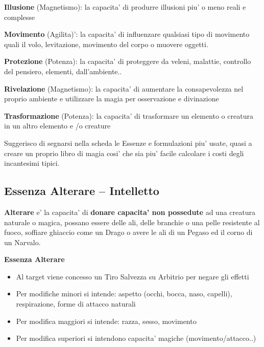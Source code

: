 \documentclass[a4paper,11pt,twoside,openany]{book}
\begin{document}
\textbf{Illusione} (Magnetismo): la capacita' di produrre illusioni piu' o meno reali e complesse

\textbf{Movimento} (Agilita)': la capacita' di influenzare qualsiasi tipo di movimento quali il volo, levitazione, movimento del corpo o muovere oggetti.

\textbf{Protezione} (Potenza): la capacita' di proteggere da veleni, malattie, controllo del pensiero, elementi, dall'ambiente..

\textbf{Rivelazione} (Magnetismo): la capacita' di aumentare la consapevolezza nel proprio ambiente e utilizzare la magia per osservazione e divinazione

\textbf{Trasformazione} (Potenza): la capacita' di trasformare un elemento o creatura in un altro elemento e /o creature

\bigskip

Suggerisco di segnarsi nella scheda le Essenze e formulazioni piu' usate, quasi a creare un proprio libro di magia cosi' che sia piu' facile calcolare i costi degli incantesimi tipici.

\pagebreak

\subsection{Essenza Alterare -- Intelletto}

\label{essenza-alterare---intelletto}

\textbf{Alterare} e' la capacita' di \textbf{donare capacita' non possedute} ad una creatura naturale o magica, possano essere delle ali, delle branchie o una pelle resistente al fuoco, soffiare ghiaccio come un Drago o avere le ali di un Pegaso ed il corno di un Narvalo.

\bigskip

\textbf{Essenza Alterare}
\begin{itemize}
\item 
Al target viene concesso un Tiro Salvezza su Arbitrio per negare gli effetti 
\item 
Per modifiche minori si intende: aspetto (occhi, bocca, naso, capelli), respirazione, forme di attacco naturali 
\item 
Per modifica maggiori si intende: razza, sesso, movimento 
\item 
Per modifica superiori si intendono capacita' magiche (movimento/attacco..) 
\end{itemize}
\end{document}
